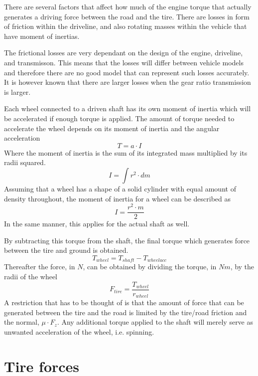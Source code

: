 There are several factors that affect how much of the engine torque that actually generates a driving force between the road and the tire. There are losses in form of friction within the driveline, and also rotating masses within the vehicle that have moment of inertias. 

The frictional losses are very dependant on the design of the engine, driveline, and transmisson. This means that the losses will differ between vehicle models and therefore there are no good model that can represent such losses accurately. It is however known that there are larger losses when the gear ratio transmission is larger. 

Each wheel connected to a driven shaft has its own moment of inertia which will be accelerated if enough torque is applied. The amount of torque needed to accelerate the wheel depends on its moment of inertia and the angular acceleration
\begin{equation}
	T = a \cdot I
\end{equation}
Where the moment of inertia is the sum of its integrated mass multiplied by its radii squared. 
\begin{equation}
	I = \int r^2 \cdot dm
\end{equation}
Assuming that a wheel has a shape of a solid cylinder with equal amount of density throughout, the moment of inertia for a wheel can be described as
\begin{equation}
	I = \dfrac{r^2 \cdot m}{2} 
\end{equation}
In the same manner, this applies for the actual shaft as well. 

By subtracting this torque from the shaft, the final torque which generates force between the tire and ground is obtained.
\begin{equation}
	T_{wheel} = T_{shaft} - T_{wheel acc}
\end{equation}
Thereafter the force, in $ N $, can be obtained by dividing the torque, in $ Nm $, by the radii of the wheel
\begin{equation}
	F_{tire} = \frac{T_{wheel}}{r_{wheel}}
\end{equation}
A restriction that has to be thought of is that the amount of force that can be generated between the tire and the road is limited by the tire/road friction and the normal, $ \mu \cdot F_{z} $. Any additional torque applied to the shaft will merely serve as unwanted acceleration of the wheel, i.e. spinning.


\section{Tire forces}


